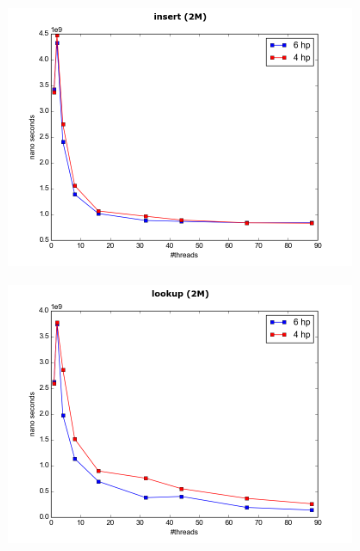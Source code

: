 \documentclass[conference]{IEEEtran}
\begin{document}
	
	\begin{figure}
		\begin{subfigure}{.5\textwidth}
			\includegraphics[width=0.45\paperwidth]{hp_comapre/insert_2M_4hp.png}
			\label{fig:4hp_insert}			
		\end{subfigure}
		\begin{subfigure}{.5\textwidth}
			\includegraphics[width=0.45\paperwidth]{hp_comapre/lookup_2M_4hp.png}	
			\label{fig:4hp_lookup}
		\end{subfigure}
		\begin{subfigure}{.5\textwidth}

\end{subfigure}
\end{figure}
\end{document}
